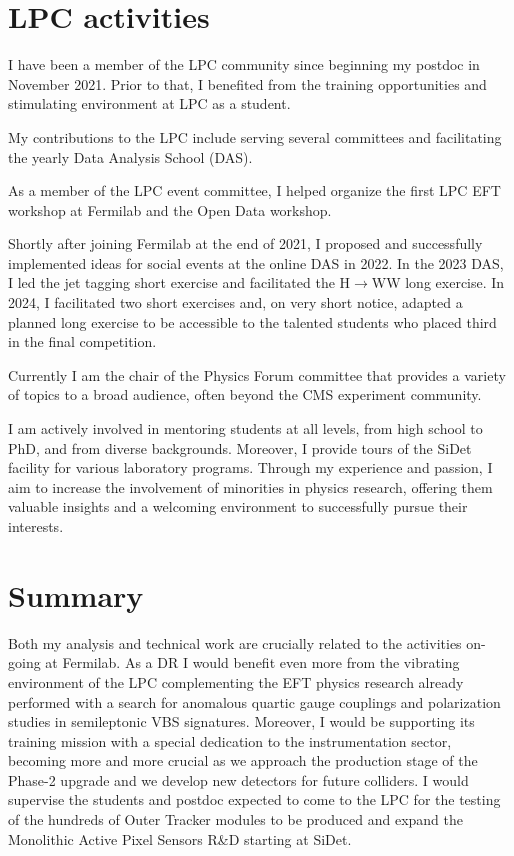 {\begin{flushleft}
 
\section{LPC activities}
\vspace{\baselineskip}
I have been a member of the LPC community since beginning my postdoc in November 2021. Prior to that, I benefited from the training opportunities and stimulating environment at LPC as a student.

My contributions to the LPC include serving several committees and facilitating the yearly Data Analysis School (DAS). 

As a member of the LPC event committee, I helped organize the first LPC EFT workshop at Fermilab and the Open Data workshop. 

Shortly after joining Fermilab at the end of 2021, I proposed and successfully implemented ideas for social events at the online DAS in 2022.
In the 2023 DAS, I led the jet tagging short exercise and facilitated the H$\to$WW long exercise. In 2024, I facilitated two short exercises and, on very short notice, adapted a planned long exercise to be accessible to the talented students who placed third in the final competition.

Currently I am the chair of the Physics Forum committee that provides a variety of topics to a broad audience, often beyond the CMS experiment community. 

I am actively involved in mentoring students at all levels, from high school to PhD, and from diverse backgrounds. Moreover, I provide tours of the SiDet facility for various laboratory programs. Through my experience and passion, I aim to increase the involvement of minorities in physics research, offering them valuable insights and a welcoming environment to successfully pursue their interests.



\section{Summary} 
\vspace{\baselineskip}
Both my analysis and technical work are crucially related to the activities on-going at Fermilab. As a DR I would benefit even more from the vibrating environment of the LPC  complementing the EFT physics research already performed with a search for anomalous quartic gauge couplings and polarization studies in semileptonic VBS signatures. Moreover, I would be supporting its training mission with a special dedication to the instrumentation sector, becoming more and more crucial as we approach the production stage of the Phase-2 upgrade and we develop new detectors for future colliders. I would supervise the students and postdoc expected to come to the LPC for the testing of the hundreds of Outer Tracker modules to be produced and expand the Monolithic Active Pixel Sensors R\&D starting at SiDet.



\end{flushleft}
}
